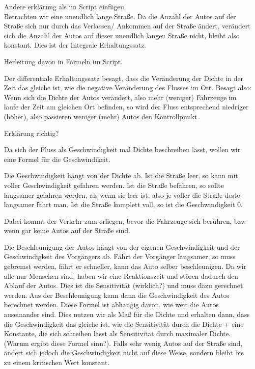 \documentclass[]{article}
\begin{document}
Andere erklärung als im Script einfügen. \\

Betrachten wir eine unendlich lange Straße. Da die Anzahl der Autos auf der Straße sich nur durch das Verlassen/ Ankommen auf der Straße ändert, verändert sich die Anzahl der Autos auf dieser unendlich langen Straße nicht, bleibt also konstant. Dies ist der Integrale Erhaltungssatz. 

Herleitung davon in Formeln im Script. 

Der differentiale Erhaltungssatz besagt, dass die Veränderung der Dichte in der Zeit das gleiche ist, wie die negative Veränderung des Flusses im Ort. Besagt also: Wenn sich die Dichte der Autos verändert, also mehr (weniger) Fahrzeuge im laufe der Zeit am gleichen Ort befinden, so wird der Fluss entsprechend niedriger (höher), also passieren weniger (mehr) Autos den Kontrollpunkt. 

Erklärung richtig? 

Da sich der Fluss als Geschwindigkeit mal Dichte beschreiben lässt, wollen wir eine Formel für die Geschwindikeit. 

Die Geschwindigkeit hängt von der Dichte ab. Ist die Straße leer, so kann mit voller Geschwindigkeit gefahren werden. Ist die Straße befahren, so sollte langsamer gefahren werden, als wenn sie leer ist, also je voller die Straße desto langsamer fährt man. Ist die Straße komplett voll, so ist die Geschwindigkeit 0. 

Dabei kommt der Verkehr zum erliegen, bevor die Fahrzeuge sich berühren, bzw wenn gar keine Autos auf der Straße sind. 

Die Beschleunigung der Autos hängt von der eigenen Geschwindigkeit und der Geschwindigkeit des Vorgängers ab. Fährt der Vorgänger langsamer, so muss gebremst werden, fährt er schneller, kann das Auto selber beschleunigen. Da wir alle nur Menschen sind, haben wir eine Reaktionszeit und stören dadurch den Ablauf der Autos. Dies ist die Sensitivität (wirklich?) und muss dazu gerechnet werden. Aus der Beschleunigung kann dann die Geschwindigkeit des Autos berechnet werden. Diese Formel ist abhängig davon, wie weit die Autos auseinander sind. Dies nutzen wir als Maß für die Dichte und erhalten dann, dass die Geschwindigkeit das gleiche ist, wie die Sensitivität durch die Dichte + eine Konstante, die sich schreiben lässt als Sensitivität durch maximaler Dichte. (Warum ergibt diese Formel sinn?). Falls sehr wenig Autos auf der Straße sind, ändert sich jedoch die Geschwindigkeit nicht auf diese Weise, sondern bleibt bis zu einem kritischen Wert konstant. 
\end{document}
